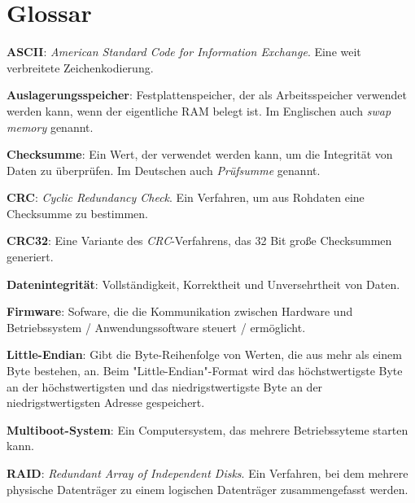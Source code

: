 \section{Glossar}

\textbf{ASCII}:
\textit{American Standard Code for Information Exchange}. Eine weit verbreitete Zeichenkodierung.

\textbf{Auslagerungsspeicher}:
Festplattenspeicher, der als Arbeitsspeicher verwendet werden kann, wenn der eigentliche RAM belegt ist.
Im Englischen auch \textit{swap memory} genannt.

\textbf{Checksumme}:
Ein Wert, der verwendet werden kann, um die Integrität von Daten zu überprüfen.
Im Deutschen auch \textit{Prüfsumme} genannt.

\textbf{CRC}:
\textit{Cyclic Redundancy Check}.
Ein Verfahren, um aus Rohdaten eine Checksumme zu bestimmen.

\textbf{CRC32}:
Eine Variante des \textit{CRC}-Verfahrens, das 32 Bit große Checksummen generiert.

\textbf{Datenintegrität}:
Vollständigkeit, Korrektheit und Unversehrtheit von Daten. 

\textbf{Firmware}:
Sofware, die die Kommunikation zwischen Hardware und Betriebssystem / Anwendungssoftware steuert / ermöglicht.

\textbf{Little-Endian}:
Gibt die Byte-Reihenfolge von Werten, die aus mehr als einem Byte bestehen, an.
Beim "Little-Endian"-Format wird das höchstwertigste Byte an der höchstwertigsten und das niedrigstwertigste Byte an der niedrigstwertigsten Adresse gespeichert.

\textbf{Multiboot-System}:
Ein Computersystem, das mehrere Betriebssyteme starten kann.

\textbf{RAID}:
\textit{Redundant Array of Independent Disks}.
Ein Verfahren, bei dem mehrere physische Datenträger zu einem logischen Datenträger zusammengefasst werden.
